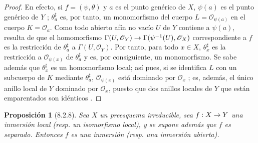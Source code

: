 \documentclass[oneside]{amsart}
\theoremstyle{ega-env-style}
\theoremstyle{ega-thm-env-style}
\newtheorem*{proposition}{Proposición}
\theoremstyle{ega-defn-env-style}
\renewcommand{\to}{\mathchoice{\longrightarrow}{\rightarrow}{\rightarrow}{\rightarrow}}
\let\EGAOriginalLabel\label
\renewcommand{\label}[1]{\phantomsection\EGAOriginalLabel{#1}}
\begin{document}
\begin{proof}
En efecto, si $f=(\psi,\theta)$ y $a$ es el punto genérico de $X$, $\psi(a)$ es el punto genérico de $Y$ ;
$\theta_a^\sharp$ es, por tanto, un monomorfismo del cuerpo $L=\mathscr{O}_{\psi(a)}$ en el cuerpo $K=\mathscr{O}_a$.
Como todo abierto afín no vacío $U$ de $Y$ contiene a $\psi(a)$, resulta de  que el homomorfismo $\Gamma(U,\mathscr{O}_Y)\to\Gamma(\psi^{-1}(U),\mathscr{O}_X)$ correspondiente a $f$ es la restricción de $\theta_a^\sharp$ a $\Gamma(U,\mathscr{O}_Y)$.
Por tanto, para todo $x\in X$, $\theta_x^\sharp$ es la restricción a $\mathscr{O}_{\psi(x)}$ de $\theta_a^\sharp$ y es, por consiguiente, un monomorfismo.
Se sabe además que $\theta_x^\sharp$ es un homomorfismo local; así pues, si se identifica $L$ con un subcuerpo de $K$ mediante $\theta_a^\sharp$, $\mathscr{O}_{\psi(x)}$ está dominado por $\mathscr{O}_x$ ;
es, además, el único anillo local de $Y$ dominado por $\mathscr{O}_x$, puesto que dos anillos locales de $Y$ que están emparentados son idénticos .
\end{proof}

\begin{proposition}[8.2.8]
\label{I.8.2.8}
Sea $X$ un preesquema \emph{irreducible}, sea $f:X\to Y$ una inmersión local \textup{(resp.} un isomorfismo local), y se supone además que $f$ es separado. Entonces $f$ es una inmersión \textup{(resp.} una inmersión abierta).
\end{proposition}
\end{document}

